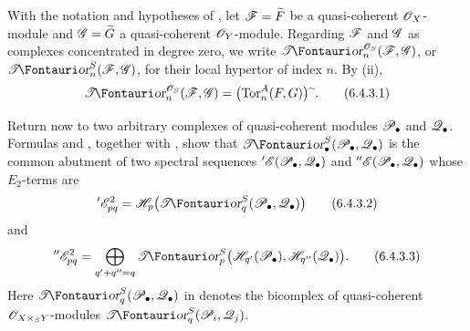 \begin{env}[6.4.3]
\label{III.6.4.3}
With the notation and hypotheses of , let
$\mathscr{F}=\widetilde F$ be a quasi-coherent $\mathscr{O}_X$-module and
$\mathscr{G}=\widetilde G$ a quasi-coherent $\mathscr{O}_Y$-module.  Regarding
$\mathscr{F}$ and $\mathscr{G}$ as complexes concentrated in degree zero, we
write $\shTor_n^{\sh O_S}(\sh F,\sh G)$, or
$\shTor_n^S(\sh F,\sh G)$, for their local hypertor of index $n$.
By (ii),
\[
  \shTor_n^{\sh O_S}(\sh F,\sh G)
  =
  \bigl(\Tor_n^A(F,G)\bigr)\supertilde.
  \tag{6.4.3.1}\label{III.6.4.3.1}
\]

Return now to two arbitrary complexes of quasi-coherent modules
$\mathscr{P}_\bullet$ and $\mathscr{Q}_\bullet$.  Formulas
 and , together with
, show that
$\shTor_\bullet^S(\sh P_\bullet,\sh Q_\bullet)$ is the common abutment
of two spectral sequences
$'\mathscr{E}(\mathscr{P}_\bullet,\mathscr{Q}_\bullet)$ and
$''\mathscr{E}(\mathscr{P}_\bullet,\mathscr{Q}_\bullet)$ whose $E_2$-terms are
\[
  '\sh E_{pq}^2
  =
  \sh H_p\bigl(\shTor_q^S(\sh P_\bullet,\sh Q_\bullet)\bigr)
  \tag{6.4.3.2}\label{III.6.4.3.2}
\]
and
\[
  ''\sh E_{pq}^2
  =
  \bigoplus_{q'+q''=q}
  \shTor_p^S
  \bigl(\sh H_{q'}(\sh P_\bullet),
        \sh H_{q''}(\sh Q_\bullet)\bigr).
  \tag{6.4.3.3}\label{III.6.4.3.3}
\]
Here $\shTor_q^S(\sh P_\bullet,\sh Q_\bullet)$ in
 denotes the bicomplex of quasi-coherent
$\mathscr{O}_{X\times_SY}$-modules
$\shTor_q^S(\sh P_i,\sh Q_j)$.
\end{env}

